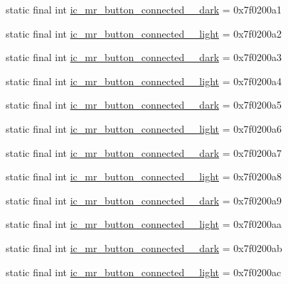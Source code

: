 \begin{CompactItemize}
\item 
static final int \hyperlink{classandroid_1_1support_1_1v7_1_1appcompat_1_1_r_1_1drawable_882033fb07fc0e848d9f21d7d63b947b}{ic\_\-mr\_\-button\_\-connected\_\_\-dark} = 0x7f0200a1
\item 
static final int \hyperlink{classandroid_1_1support_1_1v7_1_1appcompat_1_1_r_1_1drawable_e45814be9f3ad0c6201d5b9051644499}{ic\_\-mr\_\-button\_\-connected\_\_\-light} = 0x7f0200a2
\item 
static final int \hyperlink{classandroid_1_1support_1_1v7_1_1appcompat_1_1_r_1_1drawable_17104985e64776dff536664933d00291}{ic\_\-mr\_\-button\_\-connected\_\_\-dark} = 0x7f0200a3
\item 
static final int \hyperlink{classandroid_1_1support_1_1v7_1_1appcompat_1_1_r_1_1drawable_0ca673d1393a1a7c4812a49fb8deeeb3}{ic\_\-mr\_\-button\_\-connected\_\_\-light} = 0x7f0200a4
\item 
static final int \hyperlink{classandroid_1_1support_1_1v7_1_1appcompat_1_1_r_1_1drawable_b6190e09ff7d8ee9a12a047faf516fda}{ic\_\-mr\_\-button\_\-connected\_\_\-dark} = 0x7f0200a5
\item 
static final int \hyperlink{classandroid_1_1support_1_1v7_1_1appcompat_1_1_r_1_1drawable_6576c334e20591c9b07e678746b6104d}{ic\_\-mr\_\-button\_\-connected\_\_\-light} = 0x7f0200a6
\item 
static final int \hyperlink{classandroid_1_1support_1_1v7_1_1appcompat_1_1_r_1_1drawable_5d529fbde37387ad79f5d92298e0ae29}{ic\_\-mr\_\-button\_\-connected\_\_\-dark} = 0x7f0200a7
\item 
static final int \hyperlink{classandroid_1_1support_1_1v7_1_1appcompat_1_1_r_1_1drawable_284c108043215fae4e35e0f2fbf432f2}{ic\_\-mr\_\-button\_\-connected\_\_\-light} = 0x7f0200a8
\item 
static final int \hyperlink{classandroid_1_1support_1_1v7_1_1appcompat_1_1_r_1_1drawable_36db11c43fe2866d250cd43b56c2d318}{ic\_\-mr\_\-button\_\-connected\_\_\-dark} = 0x7f0200a9
\item 
static final int \hyperlink{classandroid_1_1support_1_1v7_1_1appcompat_1_1_r_1_1drawable_29debdfa0b71cb4c6977cf11d2475e63}{ic\_\-mr\_\-button\_\-connected\_\_\-light} = 0x7f0200aa
\item 
static final int \hyperlink{classandroid_1_1support_1_1v7_1_1appcompat_1_1_r_1_1drawable_4a87d7c5a52f11545637d03fcf463e87}{ic\_\-mr\_\-button\_\-connected\_\_\-dark} = 0x7f0200ab
\item 
static final int \hyperlink{classandroid_1_1support_1_1v7_1_1appcompat_1_1_r_1_1drawable_7cb942a8e8a2f3d326d8971528507aa0}{ic\_\-mr\_\-button\_\-connected\_\_\-light} = 0x7f0200ac

\end{CompactItemize}
